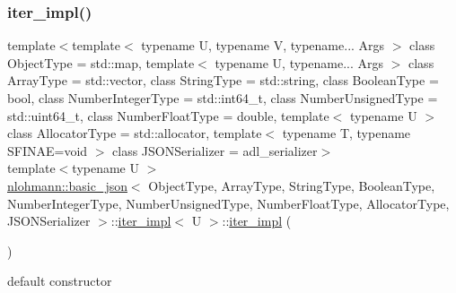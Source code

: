\subsubsection{\texorpdfstring{iter\+\_\+impl()}{iter\_impl()}\hspace{0.1cm}{\footnotesize\ttfamily [1/3]}}
{\footnotesize\ttfamily template$<$template$<$ typename U, typename V, typename... Args $>$ class Object\+Type = std\+::map, template$<$ typename U, typename... Args $>$ class Array\+Type = std\+::vector, class String\+Type  = std\+::string, class Boolean\+Type  = bool, class Number\+Integer\+Type  = std\+::int64\+\_\+t, class Number\+Unsigned\+Type  = std\+::uint64\+\_\+t, class Number\+Float\+Type  = double, template$<$ typename U $>$ class Allocator\+Type = std\+::allocator, template$<$ typename T, typename S\+F\+I\+N\+A\+E=void $>$ class J\+S\+O\+N\+Serializer = adl\+\_\+serializer$>$ \\
template$<$typename U $>$ \\
\hyperlink{classnlohmann_1_1basic__json}{nlohmann\+::basic\+\_\+json}$<$ Object\+Type, Array\+Type, String\+Type, Boolean\+Type, Number\+Integer\+Type, Number\+Unsigned\+Type, Number\+Float\+Type, Allocator\+Type, J\+S\+O\+N\+Serializer $>$\+::\hyperlink{classnlohmann_1_1basic__json_1_1iter__impl}{iter\+\_\+impl}$<$ U $>$\+::\hyperlink{classnlohmann_1_1basic__json_1_1iter__impl}{iter\+\_\+impl} (\begin{DoxyParamCaption}{ }\end{DoxyParamCaption})\hspace{0.3cm}{\ttfamily [default]}}



default constructor 

\mbox{\label{classnlohmann_1_1basic__json_1_1iter__impl_aa496f5348569e75d65592f25e1664770}} 
